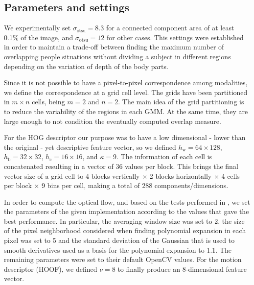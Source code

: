\documentclass[10pt,twocolumn,letterpaper]{article}
\begin{document}
\subsection{Parameters and settings}
\label{ssec:parametersandsettings}

We experimentally set $\sigma_\text{otsu} = 8.3$ for a connected component area of at least 0.1\% of the image, and  $\sigma_\text{otsu} = 12$ for other cases. This settings were established in order to maintain a trade-off between finding the maximum number of overlapping people situations without dividing a subject in different regions depending on the variation of depth of the body parts.

Since it is not possible to have a pixel-to-pixel correspondence among modalities, we define the correspondence at a grid cell level. The grids have been partitioned in $m \times n$ cells, being $m = 2$ and $n = 2$. The main idea of the grid partitioning is to reduce the variability of the regions in each GMM. At the same time, they are large enough to not condition the eventually computed overlap measure.

For the HOG descriptor our purpose was to have a low dimensional - lower than the original - yet descriptive feature vector, so we defined $h_\text{w} = 64 \times 128$, $h_\text{b} = 32 \times 32$, $h_\text{c}=16 \times 16$, and $\kappa = 9$. The information of each cell is concatenated resulting in a vector of 36 values per block. This brings the final vector size of a grid cell to 4 blocks vertically $\times$ 2 blocks horizontally $\times$ 4 cells per block $\times$ 9 bins per cell, making a total of 288 components/dimensions. 

In order to compute the optical flow, and based on the tests performed in \cite{brkic2013combining}, we set the parameters of the given implementation according to the values that gave the best performance. In particular, the averaging window size was set to 2, the size of the pixel neighborhood considered when finding polynomial expansion in each pixel was set to 5 and the standard deviation of the Gaussian that is used to smooth derivatives used as a basis for the polynomial expansion to 1.1.  The remaining parameters were set to their default OpenCV values. For the motion descriptor (HOOF), we defined $\nu = 8$ to finally produce an 8-dimensional feature vector. 
\end{document}
